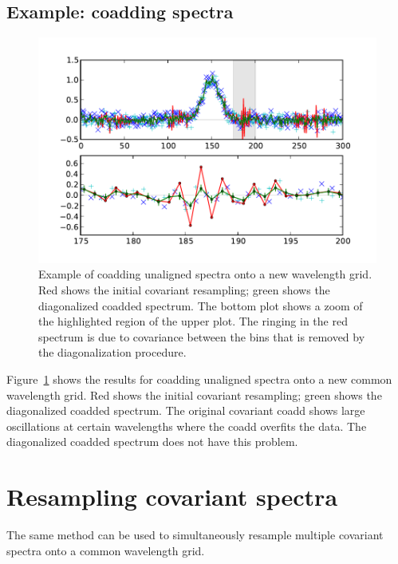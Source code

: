 \documentclass[12pt]{article}
\begin{document}
\subsection{Example: coadding spectra}

\begin{figure}[t]
\centering
\includegraphics{plots/coadd_spectra.pdf}
\caption{
Example of coadding unaligned spectra onto a new wavelength grid.
Red shows the initial covariant resampling; green shows the diagonalized
coadded spectrum.  The bottom plot shows a zoom of the highlighted region
of the upper plot.  The ringing in the red spectrum is due to covariance
between the bins that is removed by the diagonalization procedure.
}
\label{fig:coadd_spectra}
\end{figure}

Figure~\ref{fig:coadd_spectra} shows the results for coadding unaligned
spectra onto a new common wavelength grid.
Red shows the initial covariant resampling; green shows the diagonalized
coadded spectrum.  The original covariant coadd shows large oscillations
at certain wavelengths where the coadd overfits the data.  The diagonalized
coadded spectrum does not have this problem.

\section{Resampling covariant spectra}

The same method can be used to simultaneously resample multiple
covariant spectra onto a common wavelength grid.
\end{document}
